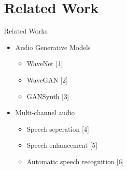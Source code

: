 \section{Related Work}
\begin{frame}{Related Works}
    \begin{itemize}
        \item Audio Generative Models

                \begin{itemize}
                    \item WaveNet [1]
                    \item WaveGAN [2]
                    \item GANSynth [3]
                \end{itemize}
        \bigskip
        \bigskip
        \item Multi-channel audio
            \begin{itemize}
                \item Speech seperation [4]
                \item Speech enhancement [5]
                \item Automatic speech recognition [6]
            \end{itemize}
    \end{itemize}
\end{frame}